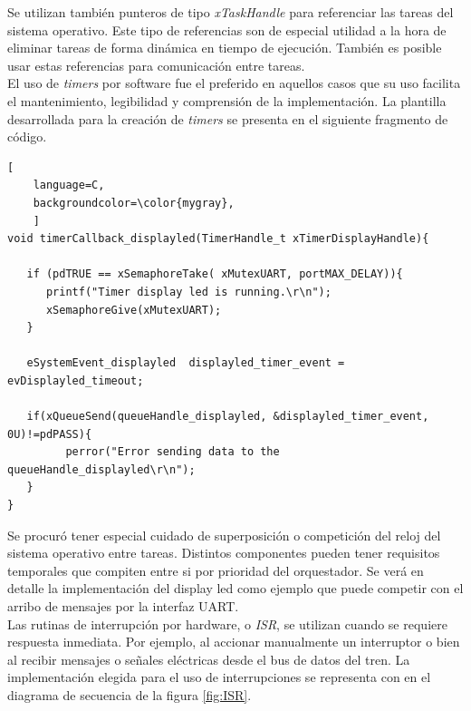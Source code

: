 Se utilizan también punteros de tipo \textit{xTaskHandle} para referenciar las tareas del sistema operativo. Este tipo de referencias son de especial utilidad a la hora de eliminar tareas de forma dinámica en tiempo de ejecución. También es posible usar estas referencias para comunicación entre tareas.\\

El uso de \textit{timers} por software fue el preferido en aquellos casos que su uso facilita el mantenimiento, legibilidad y comprensión de la implementación. La plantilla desarrollada para la creación de \textit{timers} se presenta en el siguiente fragmento de código.

\begin{lstlisting}[
	language=C, 
	backgroundcolor=\color{mygray},
	]
void timerCallback_displayled(TimerHandle_t xTimerDisplayHandle){

   if (pdTRUE == xSemaphoreTake( xMutexUART, portMAX_DELAY)){
      printf("Timer display led is running.\r\n");
      xSemaphoreGive(xMutexUART);
   }

   eSystemEvent_displayled  displayled_timer_event = evDisplayled_timeout;
   
   if(xQueueSend(queueHandle_displayled, &displayled_timer_event, 0U)!=pdPASS){
         perror("Error sending data to the queueHandle_displayled\r\n");
   }
}

\end{lstlisting}

Se procuró tener especial cuidado de superposición o competición del reloj del sistema operativo entre tareas. Distintos componentes pueden tener requisitos temporales que compiten entre si por prioridad del orquestador. Se verá en detalle la implementación del display led como ejemplo que puede competir con el arribo de mensajes por la interfaz UART.\\

Las rutinas de interrupción por hardware, o \textit{ISR}, se utilizan cuando se requiere respuesta inmediata. Por ejemplo, al accionar manualmente un interruptor o bien al recibir mensajes o señales eléctricas desde el bus de datos del tren. La implementación elegida para el uso de interrupciones se representa con en el diagrama de secuencia de la figura \ref{fig:ISR}. \\

